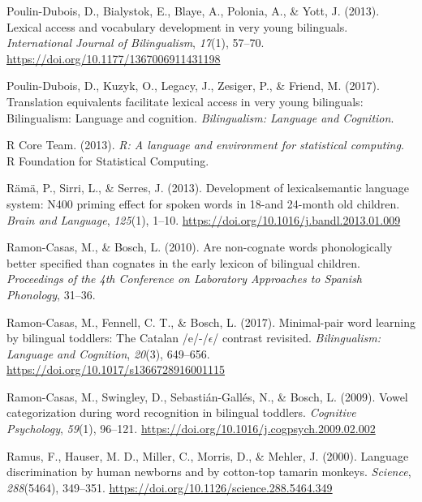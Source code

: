 \documentclass[
  12pt,
  b5paperpaper,
  twoside]{scrreprt}
\newlength{\cslhangindent}
\newlength{\cslentryspacingunit} %
\newenvironment{CSLReferences}[2] %
 {%
  \setlength{\parindent}{0pt}
  \ifodd #1
  \let\oldpar\par
  \def\par{\hangindent=\cslhangindent\oldpar}
  \fi
  \setlength{\parskip}{#2\cslentryspacingunit}
 }%
 {}
\begin{document}
\begin{CSLReferences}{1}{0}
\leavevmode{}%
Poulin-Dubois, D., Bialystok, E., Blaye, A., Polonia, A., \& Yott, J.
(2013). Lexical access and vocabulary development in very young
bilinguals. \emph{International Journal of Bilingualism}, \emph{17}(1),
57--70. \url{https://doi.org/10.1177/1367006911431198}

\leavevmode{}%
Poulin-Dubois, D., Kuzyk, O., Legacy, J., Zesiger, P., \& Friend, M.
(2017). Translation equivalents facilitate lexical access in very young
bilinguals: Bilingualism: Language and cognition. \emph{Bilingualism:
Language and Cognition}.

\leavevmode{}%
R Core Team. (2013). \emph{R: A language and environment for statistical
computing}. R Foundation for Statistical Computing.

\leavevmode{}%
Rämä, P., Sirri, L., \& Serres, J. (2013). Development of
lexical{\textendash}semantic language system: N400 priming effect for
spoken words in 18-and 24-month old children. \emph{Brain and Language},
\emph{125}(1), 1--10. \url{https://doi.org/10.1016/j.bandl.2013.01.009}

\leavevmode{}%
Ramon-Casas, M., \& Bosch, L. (2010). Are non-cognate words
phonologically better specified than cognates in the early lexicon of
bilingual children. \emph{Proceedings of the 4th Conference on
Laboratory Approaches to Spanish Phonology}, 31--36.

\leavevmode{}%
Ramon-Casas, M., Fennell, C. T., \& Bosch, L. (2017). Minimal-pair word
learning by bilingual toddlers: The {Catalan} /e/-/{\(\epsilon\)}/
contrast revisited. \emph{Bilingualism: Language and Cognition},
\emph{20}(3), 649--656. \url{https://doi.org/10.1017/s1366728916001115}

\leavevmode{}%
Ramon-Casas, M., Swingley, D., Sebastián-Gallés, N., \& Bosch, L.
(2009). Vowel categorization during word recognition in bilingual
toddlers. \emph{Cognitive Psychology}, \emph{59}(1), 96--121.
\url{https://doi.org/10.1016/j.cogpsych.2009.02.002}

\leavevmode{}%
Ramus, F., Hauser, M. D., Miller, C., Morris, D., \& Mehler, J. (2000).
Language discrimination by human newborns and by cotton-top tamarin
monkeys. \emph{Science}, \emph{288}(5464), 349--351.
\url{https://doi.org/10.1126/science.288.5464.349}


\end{CSLReferences}
\end{document}
